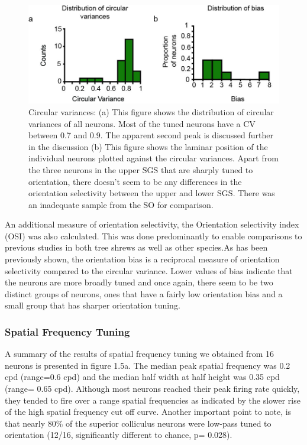 \documentclass [12pt]{report}
\begin{document}
	
	\begin{figure}
		\includegraphics[width=\linewidth]{cvlampos.jpg}
		\caption{Circular variances: (a) This figure shows the distribution of circular
			variances of all neurons. Most of the tuned neurons have a CV between 0.7 and 0.9. The apparent second peak is discussed further in the discussion (b) This figure shows the laminar position of the individual neurons plotted against the circular variances. Apart from the three neurons in the upper SGS that are sharply tuned to orientation, there doesn't seem to be any differences in the orientation selectivity between the upper and lower SGS. There was an inadequate sample from the SO for comparison.}
		\label{fig:fig4}			
	\end{figure}
	
	An additional measure of orientation selectivity, the Orientation selectivity index (OSI) was also calculated. This was done predominantly to enable comparisons to previous studies in both tree shrews as well as other species.As has been previously shown, the orientation bias is a reciprocal measure of orientation selectivity compared to the circular variance. Lower values of bias indicate that the neurons are more broadly tuned and once again, there seem to be two distinct groups of neurons, ones that have a fairly low orientation bias and a small group that has sharper orientation tuning.
	
	\subsubsection{Spatial Frequency Tuning}
	
	A summary of the results of spatial frequency tuning we obtained from 16 neurons is presented in figure 1.5a. The median peak spatial frequency was 0.2 cpd (range=0.6 cpd) and the median half width at half height was 0.35 cpd (range= 0.65 cpd). Although most neurons reached their peak firing rate quickly, they tended to fire over a range spatial frequencies as indicated by the slower rise of the high spatial frequency cut off curve. Another important point to note, is that nearly 80\% of the superior colliculus neurons were low-pass tuned to orientation (12/16, significantly different to chance, p= 0.028).
		
\end{document}
